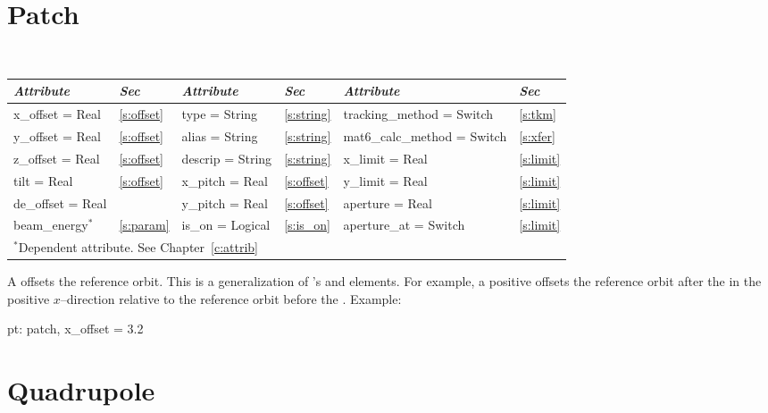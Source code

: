 {{%
\section{Patch}
\label{s:patch}

\begin{center}
\tt
\begin{tabular}{|l|l||l|l||l|l|} \hline
  {\sl Attribute} & {\sl Sec}  & {\sl Attribute} & {\sl Sec} & {\sl Attribute} & {\sl Sec} \\ \hline
  x\_offset  = Real  & \ref{s:offset} &  type = String      & \ref{s:string} & tracking\_method = Switch   & \ref{s:tkm}   \\ \hline
  y\_offset  = Real  & \ref{s:offset} &  alias = String     & \ref{s:string} & mat6\_calc\_method = Switch & \ref{s:xfer}  \\ \hline
  z\_offset  = Real  & \ref{s:offset} &  descrip = String   & \ref{s:string} & x\_limit = Real             & \ref{s:limit} \\ \hline
  tilt = Real        & \ref{s:offset} &  x\_pitch   = Real  & \ref{s:offset} & y\_limit = Real             & \ref{s:limit} \\ \hline
  de\_offset = Real  &                &  y\_pitch   = Real  & \ref{s:offset} & aperture = Real             & \ref{s:limit} \\ \hline
  beam\_energy$^*$   & \ref{s:param}  &  is\_on = Logical   & \ref{s:is_on}  & aperture\_at = Switch       & \ref{s:limit} \\ \hline
  \multicolumn{6}{l}{\small $^*$Dependent attribute. See Chapter~\ref{c:attrib}} \\
\end{tabular}
\end{center}
\toffset

A  offsets the reference orbit. This is a generalization of
\mad's  and  elements. For example, a positive
 offsets the reference orbit after the  in the
positive $x$--direction relative to the reference orbit before the
.
Example:
\begin{example}
  pt: patch, x\_offset = 3.2
\end{example}

\section{Quadrupole}
\label{s:quad}

}}
